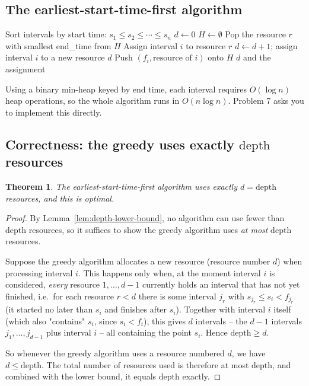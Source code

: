 \documentclass[11pt]{article}
\newtheorem{theorem}{Theorem}[section]
\begin{document}
\subsection{The earliest-start-time-first algorithm}

\begin{algorithm}[h]
\caption{Earliest-Start-Time-First (Interval Partitioning)}
\begin{algorithmic}[1]
\State Sort intervals by start time: $s_1 \le s_2 \le \cdots \le s_n$
\State $d \gets 0$ 
\State $H \gets \emptyset$ 
        \State Pop the resource $r$ with smallest end\_time from $H$
        \State Assign interval $i$ to resource $r$
    \Else
        \State $d \gets d + 1$; assign interval $i$ to a new resource $d$
    \EndIf
    \State Push $(f_i, \text{resource of } i)$ onto $H$
\EndFor
\State \Return $d$ and the assignment
\end{algorithmic}
\end{algorithm}

Using a binary min-heap keyed by end time, each interval requires $O(\log n)$ heap
operations, so the whole algorithm runs in $O(n \log n)$. Problem 7 asks you to implement
this directly.

\subsection{Correctness: the greedy uses exactly \texorpdfstring{$\mathrm{depth}$}{depth} resources}

\begin{theorem}
The earliest-start-time-first algorithm uses exactly $d = \mathrm{depth}$ resources, and
this is optimal.
\end{theorem}

\begin{proof}
By Lemma~\ref{lem:depth-lower-bound}, no algorithm can use fewer than $\mathrm{depth}$
resources, so it suffices to show the greedy algorithm uses \emph{at most}
$\mathrm{depth}$ resources.

Suppose the greedy algorithm allocates a new resource (resource number $d$) when
processing interval $i$. This happens only when, at the moment interval $i$ is considered,
\emph{every} resource $1, \ldots, d-1$ currently holds an interval that has not yet
finished, i.e.\ for each resource $r < d$ there is some interval $j_r$ with $s_{j_r} \le
s_i < f_{j_r}$ (it started no later than $s_i$ and finishes after $s_i$). Together with
interval $i$ itself (which also "contains" $s_i$, since $s_i < f_i$), this gives $d$
intervals -- the $d-1$ intervals $j_1, \ldots, j_{d-1}$ plus interval $i$ -- all containing
the point $s_i$. Hence $\mathrm{depth} \ge d$.

So whenever the greedy algorithm uses a resource numbered $d$, we have $d \le
\mathrm{depth}$. The total number of resources used is therefore at most
$\mathrm{depth}$, and combined with the lower bound, it equals $\mathrm{depth}$ exactly.
\end{proof}
\end{document}
